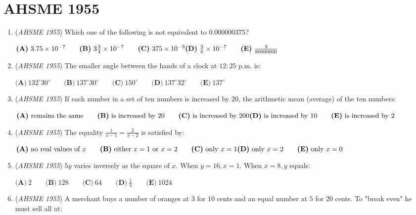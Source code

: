 \section{AHSME 1955}
        \begin{enumerate}
        	\item (\textit{AHSME 1955}) Which one of the following is not equivalent to $0.000000375$? 


 $\textbf{(A)}\ 3.75\times 10^{-7}\qquad\textbf{(B)}\ 3\frac{3}{4}\times 10^{-7}\qquad\textbf{(C)}\ 375\times 10^{-9}\\ \textbf{(D)}\ \frac{3}{8}\times 10^{-7}\qquad\textbf{(E)}\ \frac{3}{80000000}$


	\item (\textit{AHSME 1955}) The smaller angle between the hands of a clock at $12:25$ p.m. is: 


 $\textbf{(A)}\ 132^\circ 30'\qquad\textbf{(B)}\ 137^\circ 30'\qquad\textbf{(C)}\ 150^\circ\qquad\textbf{(D)}\ 137^\circ 32'\qquad\textbf{(E)}\ 137^\circ$


	\item (\textit{AHSME 1955}) If each number in a set of ten numbers is increased by $20$, the arithmetic mean (average) of the ten numbers: 


 $\textbf{(A)}\ \text{remains the same}\qquad\textbf{(B)}\ \text{is increased by 20}\qquad\textbf{(C)}\ \text{is increased by 200}\\ \textbf{(D)}\ \text{is increased by 10}\qquad\textbf{(E)}\ \text{is increased by 2}$


	\item (\textit{AHSME 1955}) The equality $\frac{1}{x-1}=\frac{2}{x-2}$ is satisfied by: 


 $\textbf{(A)}\ \text{no real values of }x\qquad\textbf{(B)}\ \text{either }x=1\text{ or }x=2\qquad\textbf{(C)}\ \text{only }x=1\\ \textbf{(D)}\ \text{only }x=2\qquad\textbf{(E)}\ \text{only }x=0$


	\item (\textit{AHSME 1955}) $5y$ varies inversely as the square of $x$. When $y=16, x=1$. When $x=8, y$ equals: 


 $\textbf{(A)}\ 2 \qquad \textbf{(B)}\ 128 \qquad \textbf{(C)}\ 64 \qquad \textbf{(D)}\ \frac{1}{4} \qquad \textbf{(E)}\ 1024$


	\item (\textit{AHSME 1955}) A merchant buys a number of oranges at $3$ for $10$ cents and an equal number at $5$ for $20$ cents. To "break even" he must sell all at: 



\end{enumerate}
